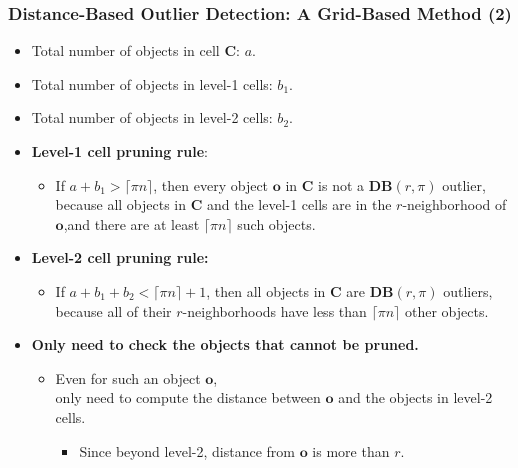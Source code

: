 \begin{frame}
	\frametitle{Distance-Based Outlier Detection: A Grid-Based Method (2)}
	\begin{itemize}
		\item Total number of objects in cell $\mathbf{C}$: $a$.
		\item Total number of objects in level-1 cells: $b_1$.
		\item Total number of objects in level-2 cells: $b_2$.
	\end{itemize}
	\begin{itemize}
		\item \textbf{Level-1 cell pruning rule}:
		      \begin{itemize}
			      \item If $a + b_1 > \lceil \pi n \rceil$, then every object $\mathbf{o}$ in $\mathbf{C}$ is not a $\mathbf{DB}(r, \pi)$ outlier, because all objects in $\mathbf{C}$ and the level-1 cells are in the $r$-neighborhood of $\mathbf{o}$,and there are at least $\lceil \pi n \rceil$ such objects.
		      \end{itemize}
		\item \textbf{Level-2 cell pruning rule:}
		      \begin{itemize}
			      \item If $a + b_1 + b_2 < \lceil \pi n \rceil + 1$, then all objects in $\mathbf{C}$ are $\mathbf{DB}(r, \pi)$ outliers, because all of their $r$-neighborhoods have less than $\lceil \pi n \rceil$ other objects.
		      \end{itemize}
		\item \textbf{Only need to check the objects that cannot be pruned.}
		      \begin{itemize}
			      \item Even for such an object $\mathbf{o}$, \\
			            only need to compute the distance between $\mathbf{o}$ and the objects in level-2 cells.
			            \begin{itemize}
				            \item Since beyond level-2, distance from $\mathbf{o}$ is more than $r$.
			            \end{itemize}
		      \end{itemize}
	\end{itemize}
\end{frame}


